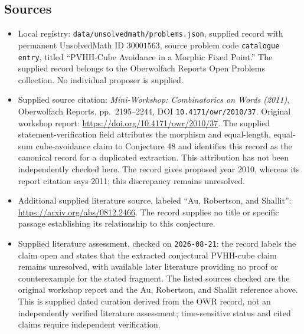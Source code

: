 \documentclass[11pt]{article}
\begin{document}
\subsection{Sources}
\begin{itemize}
\item Local registry: \texttt{data/unsolvedmath/problems.json}, supplied record with permanent UnsolvedMath ID \(30001563\), source problem code \texttt{catalogue entry}, titled ``PVHH-Cube Avoidance in a Morphic Fixed Point.'' The supplied record belongs to the Oberwolfach Reports Open Problems collection. No individual proposer is supplied.
\item Supplied source citation: \emph{Mini-Workshop: Combinatorics on Words (2011)}, Oberwolfach Reports, pp.\ 2195--2244, DOI \texttt{10.4171/owr/2010/37}. Original workshop report: \url{https://doi.org/10.4171/owr/2010/37}. The supplied statement-verification field attributes the morphism and equal-length, equal-sum cube-avoidance claim to Conjecture 48 and identifies this record as the canonical record for a duplicated extraction. This attribution has not been independently checked here. The record gives proposed year 2010, whereas its report citation says 2011; this discrepancy remains unresolved.
\item Additional supplied literature source, labeled ``Au, Robertson, and Shallit'': \url{https://arxiv.org/abs/0812.2466}. The record supplies no title or specific passage establishing its relationship to this conjecture.
\item Supplied literature assessment, checked on \texttt{2026-08-21}: the record labels the claim open and states that the extracted conjectural PVHH-cube claim remains unresolved, with available later literature providing no proof or counterexample for the stated fragment. The listed sources checked are the original workshop report and the Au, Robertson, and Shallit reference above. This is supplied dated curation derived from the OWR record, not an independently verified literature assessment; time-sensitive status and cited claims require independent verification.
\end{itemize}
\end{document}
